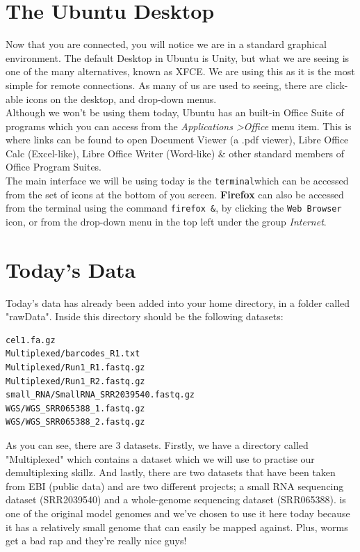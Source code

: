 \section{The Ubuntu Desktop}
\begin{note}
Now that you are connected, you will notice we are in a standard graphical environment.
The default Desktop in Ubuntu is Unity, but what we are seeing is one of the many alternatives, known as XFCE.
We are using this as it is the most simple for remote connections.
As many of us are used to seeing, there are click-able icons on the desktop, and drop-down menus. \\

Although we won't be using them today, Ubuntu has an built-in Office Suite of
programs which you can access from the \textit{Applications \textgreater Office} menu item.
This is where links can be found to open Document Viewer (a .pdf viewer), Libre Office Calc (Excel-like), Libre Office Writer (Word-like) \& other standard members of Office Program Suites. \\

The main interface we will be using today is the \texttt{terminal}which can be accessed from the set of icons at the bottom of you screen.
\textbf{Firefox} can also be accessed from the terminal using the command \texttt{firefox \&},  by clicking the \texttt{Web Browser} icon, or from the drop-down menu in the top left under the group \textit{Internet}.

\end{note}

\section{Today's Data}
\begin{note}
Today's data has already been added into your home directory, in a folder called "rawData". Inside this directory should be the following datasets:

\begin{lstlisting}
cel1.fa.gz
Multiplexed/barcodes_R1.txt
Multiplexed/Run1_R1.fastq.gz
Multiplexed/Run1_R2.fastq.gz
small_RNA/SmallRNA_SRR2039540.fastq.gz
WGS/WGS_SRR065388_1.fastq.gz
WGS/WGS_SRR065388_2.fastq.gz
\end{lstlisting}

As you can see, there are 3 datasets. Firstly, we have a directory called "Multiplexed" which contains a dataset which we will use to practise our demultiplexing skillz.
And lastly, there are two datasets that have been taken from EBI (public data) and are two different  projects; a small RNA sequencing dataset (SRR2039540) and a whole-genome sequencing dataset (SRR065388).
 is one of the original model genomes and we've chosen to use it here today because it has a relatively small genome that can easily be mapped against.
Plus, worms get a bad rap and they're really nice guys! \\
\end{note}
